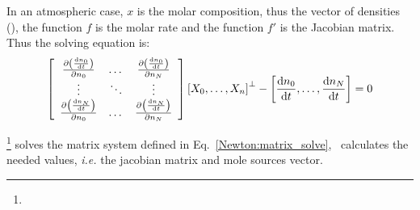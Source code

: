 In an atmospheric case, $x$ is the molar composition, thus the
vector of densities (), 
the function $f$ is the molar rate 
and the function $f'$ is the Jacobian matrix. Thus
the solving equation is:
\begin{equation}
\left[
\begin{array}{ccc}
\frac{\partial\left(\frac{\mathrm{d} n_0}{\mathrm{d} t}\right)}{\partial n_0} & \dots  & \frac{\partial\left(\frac{\mathrm{d} n_0}{\mathrm{d} t}\right)}{\partial n_N} \\
 \vdots                             & \ddots & \vdots \\
\frac{\partial\left(\frac{\mathrm{d} n_N}{\mathrm{d} t}\right)}{\partial n_0} & \dots  & \frac{\partial\left(\frac{\mathrm{d} n_N}{\mathrm{d} t}\right)}{\partial n_N} \\
\end{array}
\right] 
\left[X_0,\dots,X_n\right]^{\perp} - \left[\frac{\mathrm{d} n_0}{\mathrm{d} t},\dots,\frac{\mathrm{d} n_N}{\mathrm{d} t}\right] = 0
\label{Newton:matrix_solve}
\end{equation}

\Eigen\footnote{\EigenTux} solves the matrix system defined in Eq.~\ref{Newton:matrix_solve}, \PINC\ calculates
the needed values, \textit{i.e.} the jacobian matrix and mole sources vector.
